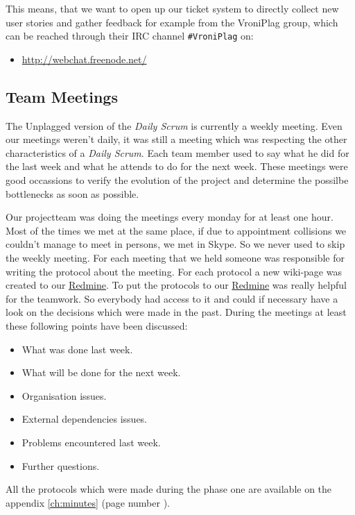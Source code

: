 This means, that we want to open up our ticket system to directly collect new user stories and gather feedback for 
example from the VroniPlag group, which can be reached through their IRC channel \texttt{\#VroniPlag} on:

\begin{itemize}
\item \url{http://webchat.freenode.net/}
\end{itemize} 


\subsection{Team Meetings}

The Unplagged version of the \textit{Daily Scrum} is currently a weekly meeting. Even our meetings weren't daily, it was still a meeting which was respecting the other characteristics of a \textit{Daily Scrum}. Each team member used to say what he did for the last week and what he attends to do for the next week. These meetings were good occassions to verify the evolution of the project and determine the possilbe bottlenecks as soon as possible. 

\minisec{}
Our projectteam was doing the meetings every monday for at least one hour. Most of the times we met at the same place, if due to appointment collisions we couldn't manage to meet in persons, we met in Skype. So we never used to skip the weekly meeting.
\minisec{}
For each meeting that we held someone was responsible for writing the protocol about the meeting. For each protocol a new wiki-page was created to our \href{http://www.redmine.org/}{Redmine}. To put the protocols to our \href{http://www.redmine.org/}{Redmine} was really helpful for the teamwork. So everybody had access to it and could if necessary have a look on the decisions which were made in the past.
\minisec{}
During the meetings at least these following points have been discussed:
\minisec{}
\begin{itemize}
\item What was done last week. 
\item What will be done for the next week.
\item Organisation issues.
\item External dependencies issues.
\item Problems encountered last week.
\item Further questions.
\end{itemize}
\minisec{}
All the protocols which were made during the phase one are available on the appendix \ref{ch:minutes} (page number \pageref{ch:minutes}).

